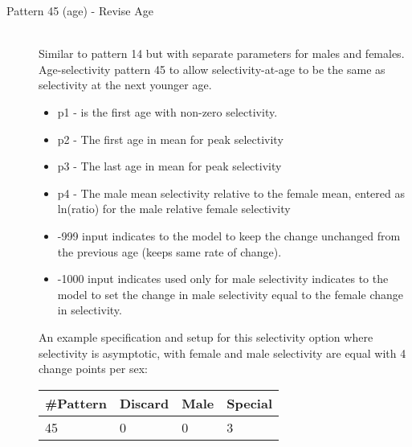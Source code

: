 \begin{description}
\item[Pattern 45 (age) - Revise Age]\hfil\\
Similar to pattern 14 but with separate parameters for males and females. Age-selectivity pattern 45 to allow selectivity-at-age to be the same as selectivity at the next younger age.  
	\begin{itemize}
		\item p1 - is the first age with non-zero selectivity.
		\item p2 - The first age in mean for peak selectivity
		\item p3 - The last age in mean for peak selectivity
		\item p4 - The male mean selectivity relative to the female mean, entered as ln(ratio) for the male relative female selectivity
		\item -999 input indicates to the model to keep the change unchanged from the previous age (keeps same rate of change).
		\item -1000 input indicates used only for male selectivity indicates to the model to set the change in male selectivity equal to the female change in selectivity.
	\end{itemize}
		An example specification and setup for this selectivity option where selectivity is asymptotic, with female and male selectivity are equal with 4 change points per sex:
		\begin{center}
			\begin{longtable}{p{1.5cm} p{1.5cm} p{1.5cm} p{1.5cm} }
				\hline
				\#Pattern & Discard & Male & Special\\
				\hline
				45 & 0 & 0 & 3 \\
				\hline
			\end{longtable}
		\end{center}
		

\end{description}
